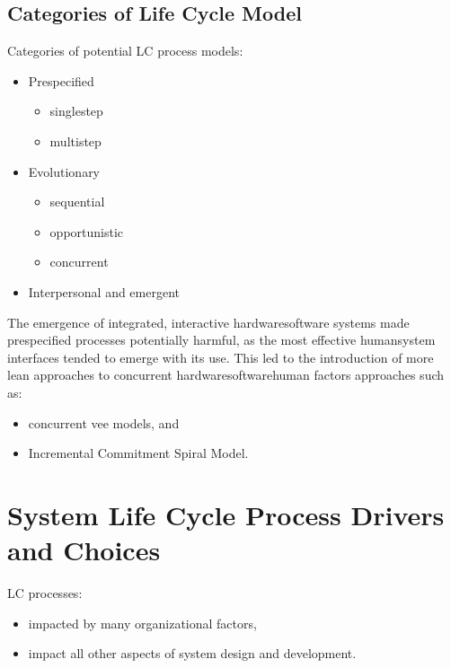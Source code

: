 \documentclass[letterpaper,10pt,english]{jupyterBook}
\begin{document}
\subsection{Categories of Life Cycle Model}
\label{\detokenize{SE/sebok:categories-of-life-cycle-model}}
\sphinxAtStartPar
Categories of potential LC process models:
\begin{itemize}
\item {} 
\sphinxAtStartPar
Pre\sphinxhyphen{}specified
\begin{itemize}
\item {} 
\sphinxAtStartPar
single\sphinxhyphen{}step

\item {} 
\sphinxAtStartPar
multi\sphinxhyphen{}step

\end{itemize}

\item {} 
\sphinxAtStartPar
Evolutionary
\begin{itemize}
\item {} 
\sphinxAtStartPar
sequential

\item {} 
\sphinxAtStartPar
opportunistic

\item {} 
\sphinxAtStartPar
concurrent

\end{itemize}

\item {} 
\sphinxAtStartPar
Interpersonal and emergent

\end{itemize}

\sphinxAtStartPar
The emergence of integrated, interactive hardware\sphinxhyphen{}software systems made pre\sphinxhyphen{}specified processes potentially harmful, as the most effective human\sphinxhyphen{}system interfaces tended to emerge with its use.
This led to the introduction of more lean approaches to concurrent hardware\sphinxhyphen{}software\sphinxhyphen{}human factors approaches such as:
\begin{itemize}
\item {} 
\sphinxAtStartPar
concurrent vee models, and

\item {} 
\sphinxAtStartPar
Incremental Commitment Spiral Model.

\end{itemize}


\section{System Life Cycle Process Drivers and Choices}
\label{\detokenize{SE/sebok:system-life-cycle-process-drivers-and-choices}}
\sphinxAtStartPar
LC processes:
\begin{itemize}
\item {} 
\sphinxAtStartPar
impacted by many organizational factors,

\item {} 
\sphinxAtStartPar
impact all other aspects of system design and development.

\end{itemize}
\end{document}
